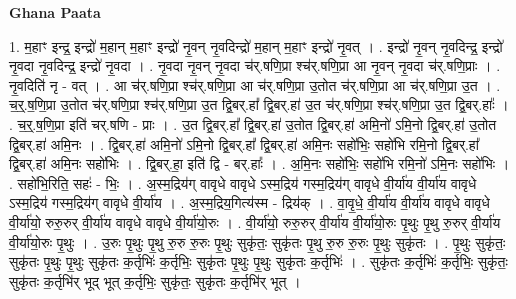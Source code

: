 \documentclass[17pt]{extarticle}
\begin{document}
\textbf{Ghana Paata } \newline

1. म॒हाꣳ इन्द्र॒ इन्द्रो॑ म॒हान् म॒हाꣳ इन्द्रो॑ नृ॒वन् नृ॒वदिन्द्रो॑ म॒हान् म॒हाꣳ इन्द्रो॑ नृ॒वत् । . इन्द्रो॑ नृ॒वन् नृ॒वदिन्द्र॒ इन्द्रो॑ नृ॒वदा नृ॒वदिन्द्र॒ इन्द्रो॑ नृ॒वदा । . नृ॒वदा नृ॒वन् नृ॒वदा च॑र्.षणि॒प्रा श्च॑र्.षणि॒प्रा आ नृ॒वन् नृ॒वदा च॑र्.षणि॒प्राः । . नृ॒वदिति॑ नृ - वत् । . आ च॑र्.षणि॒प्रा श्च॑र्.षणि॒प्रा आ च॑र्.षणि॒प्रा उ॒तोत च॑र्.षणि॒प्रा आ च॑र्.षणि॒प्रा उ॒त । . च॒र्॒.ष॒णि॒प्रा उ॒तोत च॑र्.षणि॒प्रा श्च॑र्.षणि॒प्रा उ॒त द्वि॒बर्.हा᳚ द्वि॒बर्.हा॑ उ॒त च॑र्.षणि॒प्रा श्च॑र्.षणि॒प्रा उ॒त द्वि॒बर्.हाः᳚ । . च॒र्॒.ष॒णि॒प्रा इति॑ चर्.षणि - प्राः । . उ॒त द्वि॒बर्.हा᳚ द्वि॒बर्.हा॑ उ॒तोत द्वि॒बर्.हा॑ अमि॒नो॑ ऽमि॒नो द्वि॒बर्.हा॑ उ॒तोत द्वि॒बर्.हा॑ अमि॒नः । . द्वि॒बर्.हा॑ अमि॒नो॑ ऽमि॒नो द्वि॒बर्.हा᳚ द्वि॒बर्.हा॑ अमि॒नः सहो॑भिः॒ सहो॑भि रमि॒नो द्वि॒बर्.हा᳚ द्वि॒बर्.हा॑ अमि॒नः सहो॑भिः । . द्वि॒बर्.हा॒ इति॑ द्वि - बर्.हाः᳚ । . अ॒मि॒नः सहो॑भिः॒ सहो॑भि रमि॒नो॑ ऽमि॒नः सहो॑भिः । . सहो॑भि॒रिति॒ सहः॑ - भिः॒ । . अ॒स्म॒द्रिय॑ग् वावृधे वावृधे ऽस्म॒द्रिय॑ गस्म॒द्रिय॑ग् वावृधे वी॒र्या॑य वी॒र्या॑य वावृधे ऽस्म॒द्रिय॑ गस्म॒द्रिय॑ग् वावृधे वी॒र्या॑य । . अ॒स्म॒द्रिय॒गित्य॑स्म - द्रिय॑क् । . वा॒वृ॒धे॒ वी॒र्या॑य वी॒र्या॑य वावृधे वावृधे वी॒र्या॑यो॒ रुरु॒रुर् वी॒र्या॑य वावृधे वावृधे वी॒र्या॑यो॒रुः । . वी॒र्या॑यो॒ रुरु॒रुर् वी॒र्या॑य वी॒र्या॑यो॒रुः पृ॒थुः पृ॒थु रु॒रुर् वी॒र्या॑य वी॒र्या॑यो॒रुः पृ॒थुः । . उ॒रुः पृ॒थुः पृ॒थु रु॒रु रु॒रुः पृ॒थुः सुकृ॑तः॒ सुकृ॑तः पृ॒थु रु॒रु रु॒रुः पृ॒थुः सुकृ॑तः । . पृ॒थुः सुकृ॑तः॒ सुकृ॑तः पृ॒थुः पृ॒थुः सुकृ॑तः क॒र्तृभिः॑ क॒र्तृभिः॒ सुकृ॑तः पृ॒थुः पृ॒थुः सुकृ॑तः क॒र्तृभिः॑ । . सुकृ॑तः क॒र्तृभिः॑ क॒र्तृभिः॒ सुकृ॑तः॒ सुकृ॑तः क॒र्तृभि॑र् भूद् भूत् क॒र्तृभिः॒ सुकृ॑तः॒ सुकृ॑तः क॒र्तृभि॑र् भूत् । \newline
\end{document}
